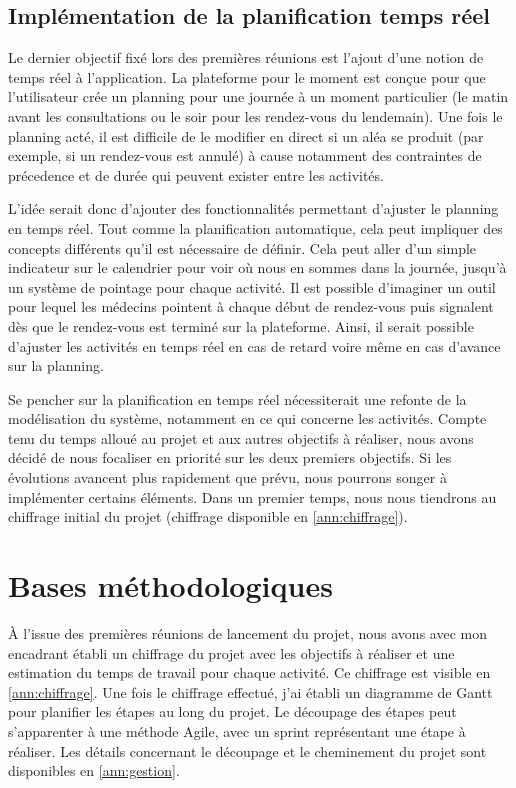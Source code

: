 \documentclass[noposter]{polytech/polytech}
\begin{document}
\subsection{Implémentation de la planification temps réel}

Le dernier objectif fixé lors des premières réunions est l'ajout d'une notion de temps réel à l'application. La plateforme pour le moment est conçue pour que l'utilisateur crée un planning pour une journée à un moment particulier (le matin avant les consultations ou le soir pour les rendez-vous du lendemain). Une fois le planning acté, il est difficile de le modifier en direct si un aléa se produit (par exemple, si un rendez-vous est annulé) à cause notamment des contraintes de précedence et de durée qui peuvent exister entre les activités. 

L'idée serait donc d'ajouter des fonctionnalités permettant d'ajuster le planning en temps réel. Tout comme la planification automatique, cela peut impliquer des concepts différents qu'il est nécessaire de définir. Cela peut aller d'un simple indicateur sur le calendrier pour voir où nous en sommes dans la journée, jusqu'à un système de pointage pour chaque activité. Il est possible d'imaginer un outil pour lequel les médecins pointent à chaque début de rendez-vous puis signalent dès que le rendez-vous est terminé sur la plateforme. Ainsi, il serait possible d'ajuster les activités en temps réel en cas de retard voire même en cas d'avance sur la planning. 

Se pencher sur la planification en temps réel nécessiterait une refonte de la modélisation du système, notamment en ce qui concerne les activités. Compte tenu du temps alloué au projet et aux autres objectifs à réaliser, nous avons décidé de nous focaliser en priorité sur les deux premiers objectifs. Si les évolutions avancent plus rapidement que prévu, nous pourrons songer à implémenter certains éléments. Dans un premier temps, nous nous tiendrons au chiffrage initial du projet (chiffrage disponible en \autoref{ann:chiffrage}).


\section{Bases méthodologiques}

À l'issue des premières réunions de lancement du projet, nous avons avec mon encadrant établi un chiffrage du projet avec les objectifs à réaliser et une estimation du temps de travail pour chaque activité. Ce chiffrage est visible en \autoref{ann:chiffrage}. Une fois le chiffrage effectué, j'ai établi un diagramme de Gantt pour planifier les étapes au long du projet. Le découpage des étapes peut s'apparenter à une méthode Agile, avec un sprint représentant une étape à réaliser. Les détails concernant le découpage et le cheminement du projet sont disponibles en \autoref{ann:gestion}.
\end{document}
